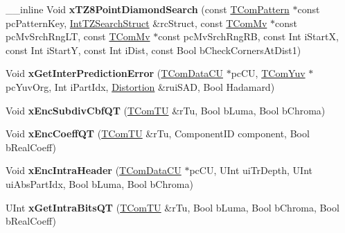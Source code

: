 \begin{DoxyCompactItemize}
\item 
\mbox{\label{class_t_enc_search_a84038123a9334739f152ff665adf9eea}} 
\+\_\+\+\_\+inline Void {\bfseries x\+T\+Z8\+Point\+Diamond\+Search} (const \hyperlink{class_t_com_pattern}{T\+Com\+Pattern} $\ast$const pc\+Pattern\+Key, \hyperlink{struct_t_enc_search_1_1_int_t_z_search_struct}{Int\+T\+Z\+Search\+Struct} \&rc\+Struct, const \hyperlink{class_t_com_mv}{T\+Com\+Mv} $\ast$const pc\+Mv\+Srch\+Rng\+LT, const \hyperlink{class_t_com_mv}{T\+Com\+Mv} $\ast$const pc\+Mv\+Srch\+Rng\+RB, const Int i\+StartX, const Int i\+StartY, const Int i\+Dist, const Bool b\+Check\+Corners\+At\+Dist1)
\item 
\mbox{\label{class_t_enc_search_a7ccdff7f326d105523523efc82191f20}} 
Void {\bfseries x\+Get\+Inter\+Prediction\+Error} (\hyperlink{class_t_com_data_c_u}{T\+Com\+Data\+CU} $\ast$pc\+CU, \hyperlink{class_t_com_yuv}{T\+Com\+Yuv} $\ast$pc\+Yuv\+Org, Int i\+Part\+Idx, \hyperlink{_type_def_8h_aed82b23ef6849d0bc3d95c92102d5b50}{Distortion} \&rui\+S\+AD, Bool Hadamard)
\item 
\mbox{\label{class_t_enc_search_af6595e09c65bf861b9da8d619156b0e0}} 
Void {\bfseries x\+Enc\+Subdiv\+Cbf\+QT} (\hyperlink{class_t_com_t_u}{T\+Com\+TU} \&r\+Tu, Bool b\+Luma, Bool b\+Chroma)
\item 
\mbox{\label{class_t_enc_search_af5497bb4fbff600b592bd1ae01a161a6}} 
Void {\bfseries x\+Enc\+Coeff\+QT} (\hyperlink{class_t_com_t_u}{T\+Com\+TU} \&r\+Tu, Component\+ID component, Bool b\+Real\+Coeff)
\item 
\mbox{\label{class_t_enc_search_af9bf26aee7130eb3384ae6c1764ab776}} 
Void {\bfseries x\+Enc\+Intra\+Header} (\hyperlink{class_t_com_data_c_u}{T\+Com\+Data\+CU} $\ast$pc\+CU, U\+Int ui\+Tr\+Depth, U\+Int ui\+Abs\+Part\+Idx, Bool b\+Luma, Bool b\+Chroma)
\item 
\mbox{\label{class_t_enc_search_a290258b7ee11570b47dd0fb2163231b9}} 
U\+Int {\bfseries x\+Get\+Intra\+Bits\+QT} (\hyperlink{class_t_com_t_u}{T\+Com\+TU} \&r\+Tu, Bool b\+Luma, Bool b\+Chroma, Bool b\+Real\+Coeff)
\item 
\mbox{\label{class_t_enc_search_a4e64ba62a4a3fe4a2203eae5ad113d34}} 

\end{DoxyCompactItemize}
